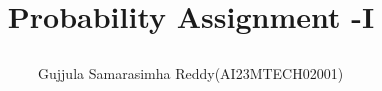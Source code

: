\documentclass[journal,12pt,twocolumn]{IEEEtran}
\DeclareMathOperator*{\Res}{Res}
\begin{document}
%


\newtheorem{theorem}{Theorem}[section]
\newtheorem{problem}{Problem}
\newtheorem{proposition}{Proposition}[section]
\newtheorem{lemma}{Lemma}[section]
\newtheorem{corollary}[theorem]{Corollary}
\newtheorem{example}{Example}[section]
\newtheorem{definition}[problem]{Definition}

\newcommand{\BEQA}{\begin{eqnarray}}
\newcommand{\EEQA}{\end{eqnarray}}
\newcommand{\define}{\stackrel{\triangle}{=}}


\providecommand{\mbf}{\mathbf}
\providecommand{\pr}[1]{\ensuremath{\Pr\left(#1\right)}}
\providecommand{\qfunc}[1]{\ensuremath{Q\left(#1\right)}}
\providecommand{\sbrak}[1]{\ensuremath{{}\left[#1\right]}}
\providecommand{\lsbrak}[1]{\ensuremath{{}\left[#1\right.}}
\providecommand{\rsbrak}[1]{\ensuremath{{}\left.#1\right]}}
\providecommand{\brak}[1]{\ensuremath{\left(#1\right)}}
\providecommand{\lbrak}[1]{\ensuremath{\left(#1\right.}}
\providecommand{\rbrak}[1]{\ensuremath{\left.#1\right)}}
\providecommand{\cbrak}[1]{\ensuremath{\left\{#1\right\}}}
\providecommand{\lcbrak}[1]{\ensuremath{\left\{#1\right.}}
\providecommand{\rcbrak}[1]{\ensuremath{\left.#1\right\}}}
\theoremstyle{remark}
\newtheorem{rem}{Remark}
\newcommand{\sgn}{\mathop{\mathrm{sgn}}}
\providecommand{\abs}[1]{\left\vert#1\right\vert}
\providecommand{\res}[1]{\Res\displaylimits_{#1}} 
\providecommand{\norm}[1]{\left\lVert#1\right\rVert}

\providecommand{\mtx}[1]{\mathbf{#1}}
\providecommand{\mean}[1]{E\left[ #1 \right]}
\providecommand{\fourier}{\overset{\mathcal{F}}{ \rightleftharpoons}}

\providecommand{\system}{\overset{\mathcal{H}}{ \longleftrightarrow}}
	
\newcommand{\solution}{\noindent \textbf{Solution: }}
\newcommand{\cosec}{\,\text{cosec}\,}
\providecommand{\dec}[2]{\ensuremath{\overset{#1}{\underset{#2}{\gtrless}}}}
\newcommand{\myvec}[1]{\ensuremath{\begin{pmatrix}#1\end{pmatrix}}}
\newcommand{\mydet}[1]{\ensuremath{\begin{vmatrix}#1\end{vmatrix}}}

\let\vec\mathbf

\vspace{3cm}
\title{

Probability Assignment -I

}
\author{ Gujjula Samarasimha Reddy(AI23MTECH02001)$^{}$
}	
\end{document}
